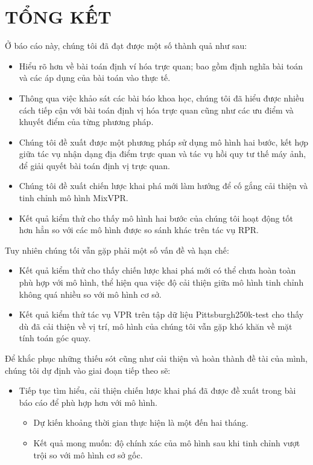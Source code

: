 \chapter{TỔNG KẾT}

Ở báo cáo này, chúng tôi đã đạt được một số thành quả như sau:
\begin{itemize}
	\item Hiểu rõ hơn về bài toán định ví hóa trực quan; bao gồm định nghĩa bài toán và các áp dụng của bài toán vào thực tế.
	\item Thông qua việc khảo sát các bài báo khoa học, chúng tôi đã hiểu được nhiều cách tiếp cận với bài toán định vị hóa trực quan cũng như các ưu điểm và khuyết điểm của từng phương pháp.
	\item Chúng tôi đề xuất được một phương pháp sử dụng mô hình hai bước, kết hợp giữa tác vụ nhận dạng địa điểm trực quan và tác vụ hồi quy tư thế máy ảnh, để giải quyết bài toán định vị trực quan.
	\item Chúng tôi đề xuất chiến lược khai phá mới làm hướng để cố gắng cải thiện và tinh chỉnh mô hình MixVPR.
	\item Kết quả kiểm thử cho thấy mô hình hai bước của chúng tôi hoạt động tốt hơn hẳn so với các mô hình được so sánh khác trên tác vụ RPR.
\end{itemize}

Tuy nhiên chúng tối vẫn gặp phải một số vấn đề và hạn chế:
\begin{itemize}
	\item Kết quả kiểm thử cho thấy chiến lược khai phá mới có thể chưa hoàn toàn phù hợp với mô hình, thể hiện qua việc độ cải thiện giữa mô hình tinh chỉnh không quá nhiều so với mô hình cơ sở.
	\item Kết quả kiểm thử tác vụ VPR trên tập dữ liệu Pittsburgh250k-test cho thấy dù đã cải thiện về vị trí, mô hình của chúng tôi vẫn gặp khó khăn về mặt tính toán góc quay.
\end{itemize}

Để khắc phục những thiếu sót cũng như cải thiện và hoàn thành đề tài của mình, chúng tôi dự định vào giai đoạn tiếp theo sẽ:
\begin{itemize}
	\item Tiếp tục tìm hiểu, cải thiện chiến lược khai phá đã được đề xuất trong bài báo cáo để phù hợp hơn với mô hình.
	      \begin{itemize}
		      \item Dự kiến khoảng thời gian thực hiện là một đến hai tháng.
		      \item Kết quả mong muốn: độ chính xác của mô hình sau khi tinh chỉnh vượt trội so với mô hình cơ sở gốc.
	      \end{itemize}
\end{itemize}
